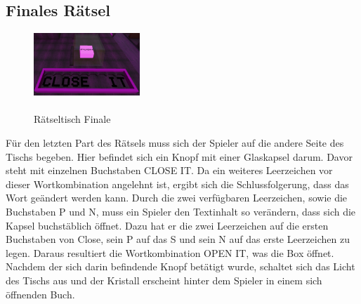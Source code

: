 \subsection{Finales Rätsel}
\begin{figure}
	\vspace*{-0.5cm}
	\includegraphics[width=4cm]{Pictures/Tisch4}
	\caption{\\ \noindent Rätseltisch Finale}
	\vspace*{-1.5cm}
	\label{fig:tisch4}
\end{figure}
Für den letzten Part des Rätsels muss sich der Spieler auf die andere Seite des Tischs begeben. Hier befindet sich ein Knopf mit einer Glaskapsel darum. Davor steht mit einzelnen Buchstaben \dq CLOSE  IT\dq. Da ein weiteres Leerzeichen vor dieser Wortkombination angelehnt ist, ergibt sich die Schlussfolgerung, dass das Wort geändert werden kann. Durch die zwei verfügbaren Leerzeichen, sowie die Buchstaben P und N, muss ein Spieler den Textinhalt so verändern, dass sich die Kapsel buchstäblich öffnet. Dazu hat er die zwei Leerzeichen auf die ersten Buchstaben von Close, sein P auf das S und sein N auf das erste Leerzeichen zu legen. Daraus resultiert die Wortkombination \dq OPEN IT\dq, was die Box öffnet. Nachdem der sich darin befindende Knopf betätigt wurde, schaltet sich das Licht des Tischs aus und der Kristall erscheint hinter dem Spieler in einem sich öffnenden Buch.
\noindent
